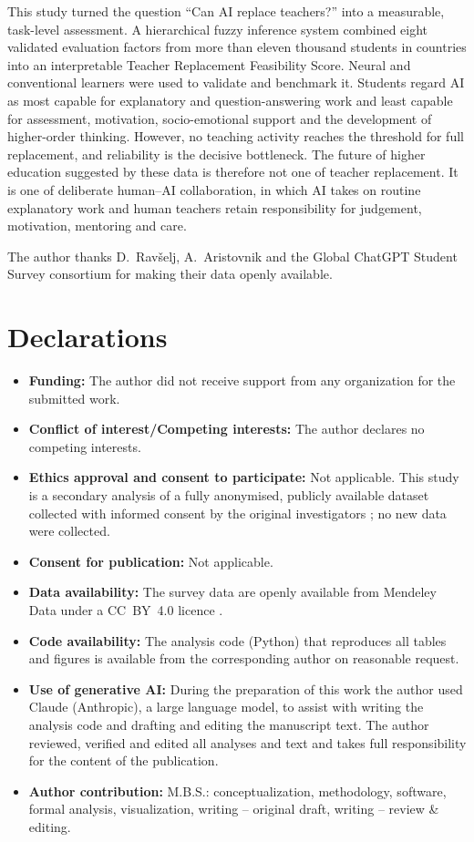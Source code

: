 \documentclass[pdflatex,sn-basic]{sn-jnl}%
\theoremstyle{plain}
\theoremstyle{remark}
\begin{document}
This study turned the question ``Can AI replace teachers?'' into a measurable, task-level assessment. A hierarchical fuzzy inference system combined eight validated evaluation factors from more than eleven thousand students in \Ncountries{} countries into an interpretable Teacher Replacement Feasibility Score. Neural and conventional learners were used to validate and benchmark it. Students regard AI as most capable for explanatory and question-answering work and least capable for assessment, motivation, socio-emotional support and the development of higher-order thinking. However, no teaching activity reaches the threshold for full replacement, and reliability is the decisive bottleneck. The future of higher education suggested by these data is therefore not one of teacher replacement. It is one of deliberate human--AI collaboration, in which AI takes on routine explanatory work and human teachers retain responsibility for judgement, motivation, mentoring and care.


\backmatter

The author thanks D.~Rav\v{s}elj, A.~Aristovnik and the Global ChatGPT Student Survey consortium for making their data openly available.

\section*{Declarations}

\begin{itemize}
\item \textbf{Funding:} The author did not receive support from any organization for the submitted work.
\item \textbf{Conflict of interest/Competing interests:} The author declares no competing interests.
\item \textbf{Ethics approval and consent to participate:} Not applicable. This study is a secondary analysis of a fully anonymised, publicly available dataset collected with informed consent by the original investigators \citep{ravselj2025}; no new data were collected.
\item \textbf{Consent for publication:} Not applicable.
\item \textbf{Data availability:} The survey data are openly available from Mendeley Data under a CC~BY~4.0 licence \citep{ravselj2024data}.
\item \textbf{Code availability:} The analysis code (Python) that reproduces all tables and figures is available from the corresponding author on reasonable request.
\item \textbf{Use of generative AI:} During the preparation of this work the author used Claude (Anthropic), a large language model, to assist with writing the analysis code and drafting and editing the manuscript text. The author reviewed, verified and edited all analyses and text and takes full responsibility for the content of the publication.
\item \textbf{Author contribution:} M.B.S.: conceptualization, methodology, software, formal analysis, visualization, writing -- original draft, writing -- review \& editing.
\end{itemize}


\end{document}
